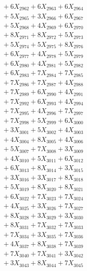 \documentclass[a4paper,10pt]{article}
\begin{document}
{\begin{align}
&\;  + 6 X_{2962} + 6 X_{2963} + 6 X_{2964} \\[0.3ex]
&\;  + 5 X_{2965} + 3 X_{2966} + 6 X_{2967} \\[0.3ex]
&\;  + 5 X_{2968} + 4 X_{2969} + 6 X_{2970} \\[0.3ex]
&\;  + 8 X_{2971} + 8 X_{2972} + 5 X_{2973} \\[0.3ex]
&\;  + 5 X_{2974} + 5 X_{2975} + 8 X_{2976} \\[0.3ex]
&\;  + 6 X_{2977} + 4 X_{2978} + 5 X_{2979} \\[0.5ex]\allowbreak
&\;  + 6 X_{2980} + 4 X_{2981} + 5 X_{2982} \\[0.3ex]
&\;  + 6 X_{2983} + 7 X_{2984} + 7 X_{2985} \\[0.3ex]
&\;  + 7 X_{2986} + 7 X_{2987} + 4 X_{2988} \\[0.3ex]
&\;  + 7 X_{2989} + 6 X_{2990} + 4 X_{2991} \\[0.3ex]
&\;  + 7 X_{2992} + 6 X_{2993} + 4 X_{2994} \\[0.3ex]
&\;  + 7 X_{2995} + 4 X_{2996} + 7 X_{2997} \\[0.3ex]
&\;  + 7 X_{2998} + 5 X_{2999} + 6 X_{3000} \\[0.3ex]
&\;  + 3 X_{3001} + 5 X_{3002} + 4 X_{3003} \\[0.3ex]
&\;  + 4 X_{3004} + 8 X_{3005} + 4 X_{3006} \\[0.3ex]
&\;  + 5 X_{3007} + 7 X_{3008} + 3 X_{3009} \\[0.5ex]\allowbreak
&\;  + 4 X_{3010} + 5 X_{3011} + 6 X_{3012} \\[0.3ex]
&\;  + 6 X_{3013} + 8 X_{3014} + 3 X_{3015} \\[0.3ex]
&\;  + 3 X_{3016} + 3 X_{3017} + 8 X_{3018} \\[0.3ex]
&\;  + 5 X_{3019} + 8 X_{3020} + 8 X_{3021} \\[0.3ex]
&\;  + 6 X_{3022} + 7 X_{3023} + 7 X_{3024} \\[0.3ex]
&\;  + 4 X_{3025} + 3 X_{3026} + 7 X_{3027} \\[0.3ex]
&\;  + 8 X_{3028} + 3 X_{3029} + 3 X_{3030} \\[0.3ex]
&\;  + 8 X_{3031} + 7 X_{3032} + 7 X_{3033} \\[0.3ex]
&\;  + 7 X_{3034} + 3 X_{3035} + 7 X_{3036} \\[0.3ex]
&\;  + 4 X_{3037} + 8 X_{3038} + 7 X_{3039} \\[0.5ex]\allowbreak
&\;  + 7 X_{3040} + 7 X_{3041} + 3 X_{3042} \\[0.3ex]
&\;  + 3 X_{3043} + 8 X_{3044} + 7 X_{3045} \\[0.3ex]

\end{align}}
\end{document}
